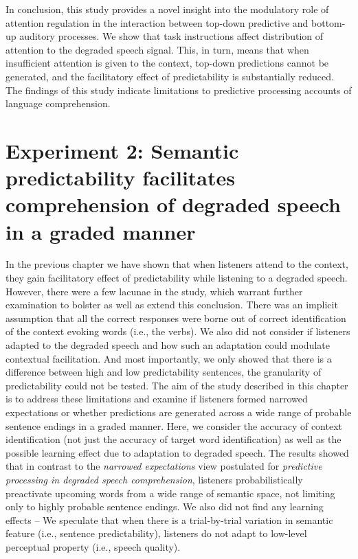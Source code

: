\documentclass[a4paper, nobind]{templates/ociamthesis}
\begin{document}
In conclusion, this study provides a novel insight into the modulatory role of attention regulation in the interaction between top-down predictive and bottom-up auditory processes.
We show that task instructions affect distribution of attention to the degraded speech signal.
This, in turn, means that when insufficient attention is given to the context, top-down predictions cannot be generated, and the facilitatory effect of predictability is substantially reduced.
The findings of this study indicate limitations to predictive processing accounts of language comprehension.

\hypertarget{experiment-2-semantic-predictability-facilitates-comprehension-of-degraded-speech-in-a-graded-manner}{%
\chapter{Experiment 2: Semantic predictability facilitates comprehension of degraded speech in a graded manner}\label{experiment-2-semantic-predictability-facilitates-comprehension-of-degraded-speech-in-a-graded-manner}}

In the previous chapter we have shown that when listeners attend to the context, they gain facilitatory effect of predictability while listening to a degraded speech.
However, there were a few lacunae in the study, which warrant further examination to bolster as well as extend this conclusion.
There was an implicit assumption that all the correct responses were borne out of correct identification of the context evoking words (i.e., the verbs).
We also did not consider if listeners adapted to the degraded speech and how such an adaptation could modulate contextual facilitation.
And most importantly, we only showed that there is a difference between high and low predictability sentences, the granularity of predictability could not be tested.
The aim of the study described in this chapter is to address these limitations and examine if listeners formed narrowed expectations or whether predictions are generated across a wide range of probable sentence endings in a graded manner.
Here, we consider the accuracy of context identification (not just the accuracy of target word identification) as well as the possible learning effect due to adaptation to degraded speech.
The results showed that in contrast to the \emph{narrowed expectations} view postulated for \emph{predictive processing in degraded speech comprehension},
listeners probabilistically preactivate upcoming words from a wide range of semantic space, not limiting only to highly probable sentence endings.
We also did not find any learning effects --
We speculate that when there is a trial-by-trial variation in semantic feature (i.e., sentence predictability), listeners do not adapt to low-level perceptual property (i.e., speech quality).
\end{document}
